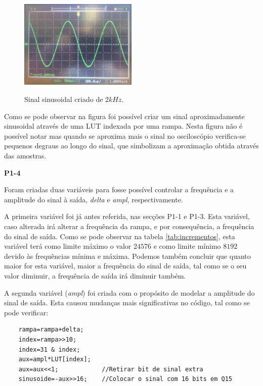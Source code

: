 \documentclass[11pt]{article}
\begin{document}
\begin{figure}[H]
	\centering
	\includegraphics[width=0.5\textwidth]{./P1_1seno}~\\
	\caption{Sinal sinusoidal criado de $ 2 kHz $.}
	\label{fig:sen2k}
\end{figure}

Como se pode observar na figura foi possível criar um sinal aproximadamente sinusoidal através de uma LUT indexada por uma rampa. Nesta figura não é possível notar mas quando se aproxima mais o sinal no osciloscópio verifica-se pequenos degraus ao longo do sinal, que simbolizam a aproximação obtida através das amostras.
\vspace{2 mm}

\textbf{P1-4}

Foram criadas duas variáveis para fosse possível controlar a frequência e a amplitude do sinal à saída, \textit{delta} e \textit{ampl}, respectivamente.

A primeira variável foi já antes referida, nas secções P1-1 e P1-3. Esta variável, caso alterada irá alterar a frequência da rampa, e por consequência, a frequência do sinal de saída. Como se pode observar na tabela \ref{tab:incrementos}, esta variável terá como limite máximo o valor $ 24576 $ e como limite mínimo $ 8192 $ devido às frequências mínima e máxima. Podemos também concluir que quanto maior for esta variável, maior a frequência do sinal de saída, tal como se o seu valor diminuir, a frequência de saída irá diminuir também.

A segunda variável (\textit{ampl}) foi criada com o propósito de modelar a amplitude do sinal de saída. Esta causou mudanças mais significativas no código, tal como se pode verificar:

\begin{lstlisting}
	rampa=rampa+delta;
	index=rampa>>10;
	index=31 & index;        
	aux=ampl*LUT[index];
	aux=aux<<1;            //Retirar bit de sinal extra
	sinusoide=-aux>>16;    //Colocar o sinal com 16 bits em Q15
\end{lstlisting}
\end{document}
